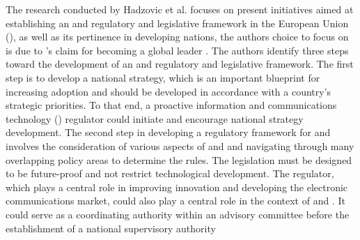 The research conducted by Hadzovic et al. \cite{hadzovic2023path} focuses on
present initiatives aimed at establishing an \hyperlink{\acronym}{\acronym} and \hyperlink{\acronym}{\acronym} regulatory and legislative
framework in the European Union (\hyperlink{\acronym}{\acronym}), as well as its pertinence in developing nations, the authors
choice to focus on \hyperlink{\acronym}{\acronym} is due to \hyperlink{\acronym}{\acronym}'s claim for becoming a global leader \cite{european2021europe}. The authors
identify three steps toward the development of an \hyperlink{\acronym}{\acronym} and \hyperlink{\acronym}{\acronym} regulatory and
legislative framework. The first step is to develop a national \hyperlink{\acronym}{\acronym} strategy, which
is an important blueprint for increasing \hyperlink{\acronym}{\acronym} adoption and should be developed
in accordance with a country's strategic priorities. To that end, a proactive
information and communications technology (\hyperlink{\acronym}{\acronym}) regulator could initiate and encourage
national \hyperlink{\acronym}{\acronym} strategy development. The second step in developing a regulatory
framework for \hyperlink{\acronym}{\acronym} and \hyperlink{\acronym}{\acronym} involves the consideration of various aspects of \hyperlink{\acronym}{\acronym}
and \hyperlink{\acronym}{\acronym} and navigating through many overlapping policy areas to determine the rules.
The legislation must be designed to be future-proof and not restrict technological
development. The \hyperlink{\acronym}{\acronym} regulator, which plays a central role in improving innovation
and developing the electronic communications market, could also play a central role
in the context of \hyperlink{\acronym}{\acronym} and \hyperlink{\acronym}{\acronym}. It could serve as a coordinating authority within
an advisory committee before the establishment of a national supervisory authority
